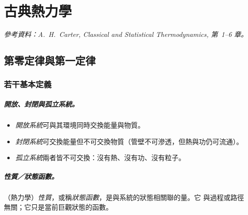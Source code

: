 
\providecommand{\dd}{\mathrm{d}}
\providecommand{\dbar}{\mathchar'26\mkern-12mu\mathrm{d}}  %
\providecommand{\pd}[2]{\dfrac{\partial #1}{\partial #2}}
\providecommand{\pa}[2]{\left(\dfrac{\partial #1}{\partial #2}\right)}

\chapter{古典熱力學}

\noindent\textit{參考資料：A.~H.~Carter, \emph{Classical and Statistical Thermodynamics}, 第~1--6 章。}

\section{第零定律與第一定律}

\subsection{若干基本定義}

\paragraph{開放、封閉與孤立系統。}
\begin{itemize}
    \item \emph{開放系統}可與其環境同時交換能量與物質。
    \item \emph{封閉系統}可交換能量但不可交換物質（管壁不可滲透，但熱與功仍可流通）。
    \item \emph{孤立系統}兩者皆不可交換：沒有熱、沒有功、沒有粒子。
\end{itemize}

\paragraph{性質／狀態函數。}
（熱力學）\emph{性質}，或稱\emph{狀態函數}，是與系統的狀態相關聯的量。它
與過程或路徑無關；它只是當前巨觀狀態的函數。

